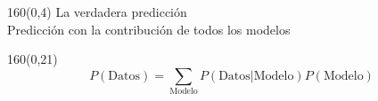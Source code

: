 \documentclass[shownotes,aspectratio=169]{beamer}
\begin{document}
\begin{frame}[plain]
\begin{textblock}{160}(0,4)
\centering \LARGE  La verdadera predicción \\
\large Predicción con la contribución de todos los modelos
\end{textblock}


\begin{textblock}{160}(0,21)
\begin{equation*}
P(\text{Datos}) =  \sum_{\text{Modelo}} P(\text{Datos}|\text{Modelo}) P(\text{Modelo})
\end{equation*}
\end{textblock}

%



\end{frame}






%
%
%
%
%
%
\end{document}
